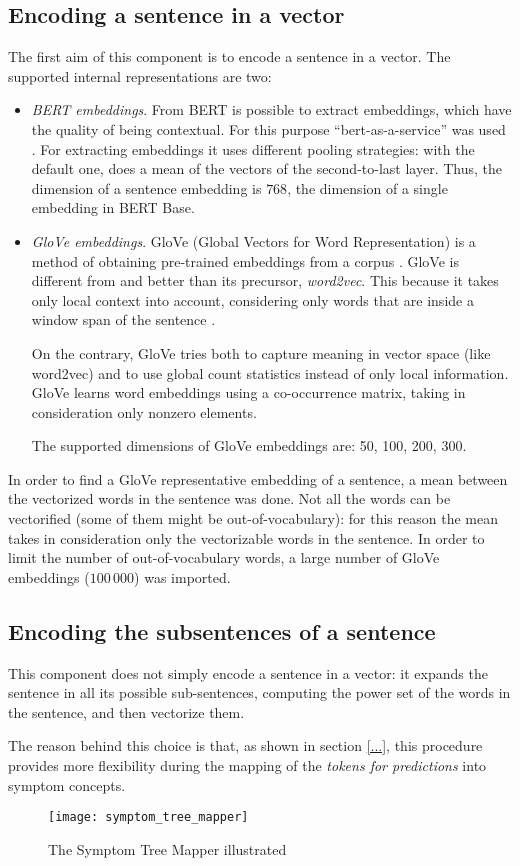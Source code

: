 \subsection{Encoding a sentence in a vector}
The first aim of this component is to encode a sentence in a vector. The supported internal representations are two:
\begin{itemize}
  \item \textit{BERT embeddings}. From BERT is possible to extract embeddings, which have the quality of being contextual. For this purpose ``bert-as-a-service'' was used \cite{baas}. For extracting embeddings it uses different pooling strategies: with the default one, does a mean of the vectors of the second-to-last layer. Thus, the dimension of a sentence embedding is $768$, the dimension of a single embedding in BERT Base.
  \item \textit{GloVe embeddings}. GloVe (Global Vectors for Word Representation) is a method of obtaining pre-trained embeddings from a corpus \cite{glove}. GloVe is different from and better than its precursor, \textit{word2vec}. This because it takes only local context into account, considering only words that are inside a window span of the sentence \cite{word2vec}.
  
  On the contrary, GloVe tries both to capture meaning in vector space (like word2vec) and to use global count statistics instead of only local information. GloVe learns word embeddings using a co-occurrence matrix, taking in consideration only nonzero elements.
  
  The supported dimensions of GloVe embeddings are: 50, 100, 200, 300.
\end{itemize}

In order to find a GloVe representative embedding of a sentence, a mean between the vectorized words in the sentence was done. Not all the words can be vectorified (some of them might be out-of-vocabulary): for this reason the mean takes in consideration only the vectorizable words in the sentence. In order to limit the number of out-of-vocabulary words, a large number of GloVe embeddings ($100\,000$) was imported.

\subsection{Encoding the subsentences of a sentence}
This component does not simply encode a sentence in a vector: it expands the sentence in all its possible sub-sentences, computing the power set of the words in the sentence, and then vectorize them.

The reason behind this choice is that, as shown in section \ref{...}, this procedure provides more flexibility during the mapping of the \textit{tokens for predictions} into symptom concepts.

\begin{figure}[h]
\centering
\texttt{[image: symptom\_tree\_mapper]}
\caption{The Symptom Tree Mapper illustrated}
\medskip
\label{fig:symptom_t_m}
\end{figure}
